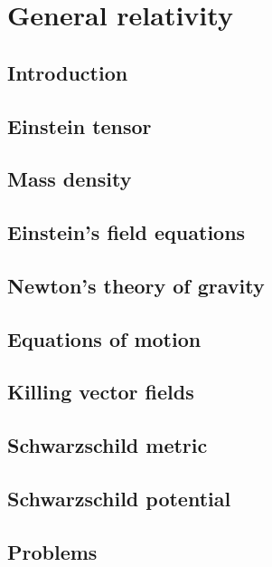 \chapter{General relativity}

\section{Introduction}

\section{Einstein tensor}

\section{Mass density}

\section{Einstein's field equations}

\section{Newton's theory of gravity}

\section{Equations of motion}

\section{Killing vector fields}

\section{Schwarzschild metric}

\section{Schwarzschild potential}

\section{Problems}
